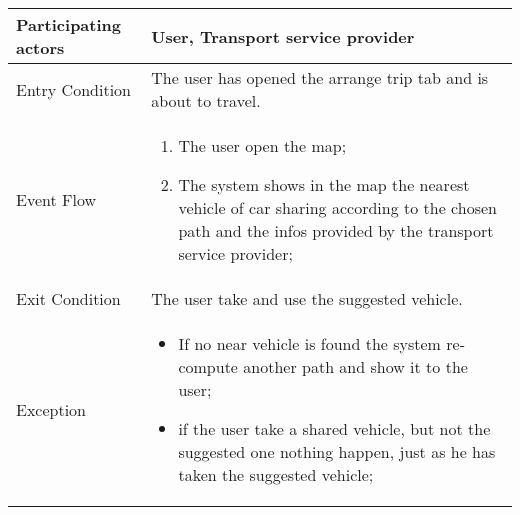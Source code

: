 \begin{table}[H]
	\begin{center}
		\begin{tabular}{ | p{} | p{} | }
		\hline
		Participating actors &  User, Transport service provider\\
		\hline
		Entry Condition & The user has opened the arrange trip tab and is about to travel.\\
		\hline
		Event Flow & 
			\begin{enumerate}
				\item The user open the map;
				\item The system shows in the map the nearest vehicle of car sharing according to the chosen path and the infos provided by the transport service provider;
			\end{enumerate} \\
		\hline
		Exit Condition & The user take and use the suggested vehicle. \\
		\hline
		Exception &
				\begin{itemize}
   					\item If no near vehicle is found the system re-compute another path and show it to the user;
   					\item if the user take a shared vehicle, but not the suggested one nothing happen, just as he has taken the suggested vehicle;
   				\end{itemize} \\ 
		\hline
		\end{tabular}
	\end{center}
\end{table}